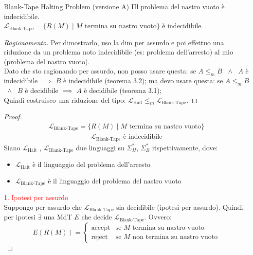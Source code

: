 \documentclass{article}  %
\theoremstyle{definition}
\newenvironment{ragionamento}[1][]
  {\begin{proof}[Ragionamento#1]\renewcommand{\qedsymbol}{}\normalfont}
  {\end{proof}}
\begin{document}
\begin{theorem}{Blank-Tape Halting Problem (versione A)}
	IIl problema del nastro vuoto è indecidibile. \\
	$\mathcal{L}_{\text{Blank-Tape}} = \{R(M) \mid M \text{ termina su nastro vuoto}\}$ è indecidibile.
	\footnotesize %
	\begin{ragionamento}
		Per dimostrarlo, uso la dim per assurdo e poi effettuo una riduzione da un problema noto indecidibile (es: problema dell'arresto) al mio (problema del nastro vuoto). \\
		Dato che sto ragionando per assurdo, non posso usare questa: se $A \leq_m B$ $\;\wedge\;$ $A$ è indecidibile $\implies$ $B$ è indecidibile (teorema 3.2); ma devo usare
		questa: se $A \leq_m B$ $\;\wedge\;$ $B$ è decidibile $\implies$ $A$ è decidibile (teorema 3.1); \\
		Quindi costruisco una riduzione del tipo: $\mathcal{L}_{\text{Halt}} \leq_m \mathcal{L}_{\text{Blank-Tape}}$.
	\end{ragionamento}
	\begin{proof}
		\begin{align*}
			\mathcal{L}_{\text{Blank-Tape}} = \{R(M) \mid M \text{ termina su nastro vuoto}\} \tag*{(ipotesi)}
		\end{align*}
		\begin{align*}
			\mathcal{L}_{\text{Blank-Tape}} \text{ è indecidibile} \tag*{(tesi)}
		\end{align*}
		Siano $\mathcal{L}_{\text{Halt}}$ , $\mathcal{L}_{\text{Blank-Tape}}$ due linguaggi su $\Sigma_H^*$, $\Sigma_B^*$ rispettivamente, dove:
		\begin{itemize}
			\item $\mathcal{L}_{\text{Halt}}$ è il linguaggio del problema dell'arresto
			\item $\mathcal{L}_{\text{Blank-Tape}}$ è il linguaggio del problema del nastro vuoto
		\end{itemize}
		\textcolor{red}{1. Ipotesi per assurdo} \\
		Suppongo per assurdo che $\mathcal{L}_{\text{Blank-Tape}}$ sia decidibile (ipotesi per assurdo). Quindi per ipotesi $\exists$ una MdT $E$
		che decide $\mathcal{L}_{\text{Blank-Tape}}$. Ovvero:
		\[
			E(R(M)) =
			\begin{cases}
				\text{accept} & \text{se } M \text{ termina su nastro vuoto}      \\
				\text{reject} & \text{se } M \text{  non termina su nastro vuoto}
			\end{cases}
\]
\end{proof}
\end{theorem}
\end{document}
